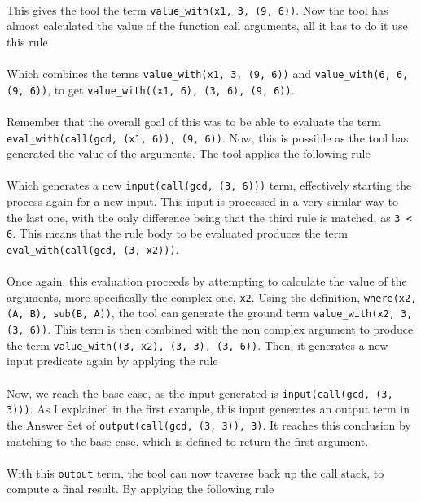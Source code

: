 
\mbox{} \\
This gives the tool the term \lstinline{value_with(x1, 3, (9, 6))}. Now the tool has almost calculated the value of the function call arguments, all it has to do it use this rule \\%


\mbox{} \\
Which combines the terms \lstinline{value_with(x1, 3, (9, 6))} and \lstinline{value_with(6, 6, (9, 6))}, to get \lstinline{value_with((x1, 6), (3, 6), (9, 6))}. \\ \\ %
Remember that the overall goal of this was to be able to evaluate the term \lstinline{eval_with(call(gcd, (x1, 6)), (9, 6))}. Now, this is possible as the tool has generated the value of the arguments. The tool applies the following rule \\ %


\mbox{} \\
Which generates a new \lstinline{input(call(gcd, (3, 6)))} term, effectively starting the process again for a new input. This input is processed in a very similar way to the last one, with the only difference being that the third rule is matched, as \lstinline{3 < 6}. This means that the rule body to be evaluated produces the term \lstinline{eval_with(call(gcd, (3, x2)))}. \\ \\%
Once again, this evaluation proceeds by attempting to calculate the value of the arguments, more specifically the complex one, \lstinline{x2}. Using the definition, \lstinline{where(x2, (A, B), sub(B, A))}, the tool can generate the ground term \lstinline{value_with(x2, 3, (3, 6))}. This term is then combined with the non complex argument to produce the term \lstinline{value_with((3, x2), (3, 3), (3, 6))}. Then, it generates a new input predicate again by applying the rule \\ 


\mbox{} \\
Now, we reach the base case, as the input generated is \lstinline{input(call(gcd, (3, 3)))}. As I explained in the first example, this input generates an output term in the Answer Set of \lstinline{output(call(gcd, (3, 3)), 3)}. It reaches this conclusion by matching to the base case, which is defined to return the first argument. \\ \\
With this \lstinline{output} term, the tool can now traverse back up the call stack, to compute a final result. By applying the following rule \\ %

